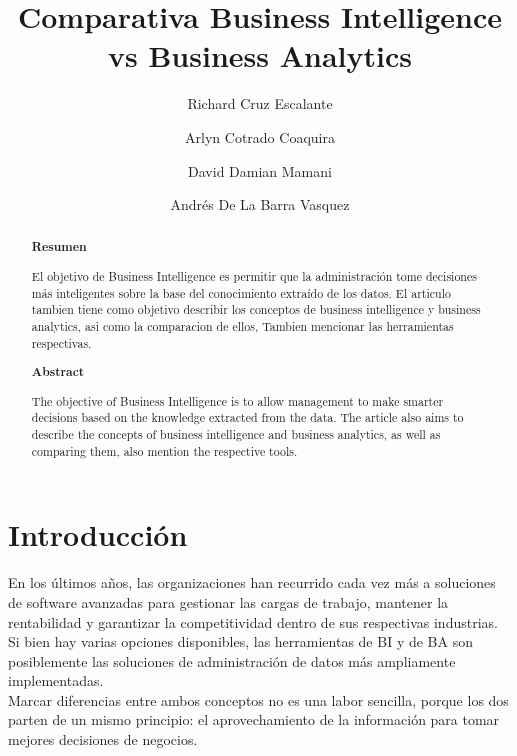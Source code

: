 \documentclass[%
 reprint,
 amsmath,amssymb,
 aps,
]{revtex4-1}
\begin{document}
\title{Comparativa Business Intelligence vs Business Analytics}
\author{Richard Cruz Escalante}
\author{Arlyn Cotrado Coaquira}
\author{David Damian Mamani}
\author{Andrés De La Barra Vasquez}
%

\begin{abstract}
\begin{center}
\textbf{Resumen}
\end{center}

El objetivo de Business Intelligence es permitir que la administración tome decisiones más inteligentes sobre la base del conocimiento extraído de los datos. 
El articulo tambien tiene como objetivo describir los conceptos de business intelligence y business analytics, asi como la comparacion de ellos,  Tambien mencionar las herramientas respectivas.


\begin{center}
\textbf{Abstract}
\end{center}
The objective of Business Intelligence is to allow management to make smarter decisions based on the knowledge extracted from the data.
The article also aims to describe the concepts of business intelligence and business analytics, as well as comparing them, also mention the respective tools.

\end{abstract}



\maketitle


\section {Introducción}


En los últimos años, las organizaciones han recurrido cada vez más a soluciones de software avanzadas para gestionar las cargas de trabajo, mantener la rentabilidad y garantizar la competitividad dentro de sus respectivas industrias. Si bien hay varias opciones disponibles, las herramientas de BI y de BA son posiblemente las soluciones de administración de datos más ampliamente implementadas. \\
Marcar diferencias entre ambos conceptos no es una labor sencilla, porque los dos parten de un mismo principio: el aprovechamiento de la información para tomar mejores decisiones de negocios.
\end{document}

